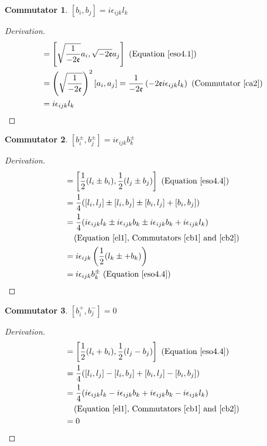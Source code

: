 \documentclass[12pt,a4paper]{report}
\theoremstyle{definition}
\newtheorem{commutator}{Commutator}[section]
\newenvironment{derivation}
  {\renewcommand\qedsymbol{$\square$}\begin{proof}[Derivation]}
  {\end{proof}}
\theoremstyle{remark}
\theoremstyle{remark}
\begin{document}
\begin{appendices}
\begin{commutator}\label{cb2}
$[b_i,b_j]=i\epsilon_{ijk}l_k$
\end{commutator}
\begin{derivation}
\begin{align*}
[b_i,b_j] &= \left[\sqrt{\frac{1}{-2\mathfrak{e}}}a_i,\sqrt{-2\mathfrak{e}}a_j\right] \text{ (Equation~\ref{eso4.1})} \\
&= \left(\sqrt{\frac{1}{-2\mathfrak{e}}}\right)^2[a_i,a_j]=\frac{1}{-2\mathfrak{e}}\left(-2\mathfrak{e}i\epsilon_{ijk}l_k\right) \text{ (Commutator~\ref{ca2})} \\
&= i\epsilon_{ijk}l_k
\end{align*}
\end{derivation}

\begin{commutator}\label{cb+-1}
$[b_i^{\pm},b_j^{\pm}]=i\epsilon_{ijk}b_k^{\pm}$
\end{commutator}
\begin{derivation}
\begin{align*}
[b_i^{\pm},b_j^{\pm}] &= \left[\frac{1}{2}(l_i\pm b_i),\frac{1}{2}(l_j\pm b_j)\right] \text{ (Equation~\ref{eso4.4})} \\
&= \frac{1}{4}([l_i,l_j]\pm[l_i,b_j]\pm[b_i,l_j]+[b_i,b_j]) \\
&= \frac{1}{4}(i\epsilon_{ijk}l_k\pm i\epsilon_{ijk}b_k\pm i\epsilon_{ijk}b_k+i\epsilon_{ijk}l_k) \\
&\phantom{=} \text{ (Equation~\ref{el1}, Commutators~\ref{cb1} and~\ref{cb2})} \\
&= i\epsilon_{ijk}\left(\frac{1}{2}(l_k\pm +b_k)\right) \\
&= i\epsilon_{ijk}b_k^{\pm} \text{ (Equation~\ref{eso4.4})}
\end{align*}
\end{derivation}

\begin{commutator}\label{cb+-2}
$[b_i^+,b_j^-]=0$
\end{commutator}
\begin{derivation}
\begin{align*}
[b_i^+,b_j^-] &= \left[\frac{1}{2}(l_i+b_i),\frac{1}{2}(l_j-b_j)\right] \text{ (Equation~\ref{eso4.4})} \\
&= \frac{1}{4}([l_i,l_j]-[l_i,b_j]+[b_i,l_j]-[b_i,b_j]) \\
&= \frac{1}{4}(i\epsilon_{ijk}l_k-i\epsilon_{ijk}b_k+i\epsilon_{ijk}b_k-i\epsilon_{ijk}l_k) \\
&\phantom{=} \text{ (Equation~\ref{el1}, Commutators~\ref{cb1} and~\ref{cb2})} \\
&=0
\end{align*}
\end{derivation}


\end{appendices}
\end{document}

